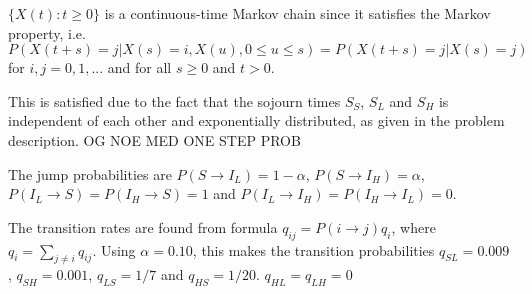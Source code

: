 $\{X(t):t \geq 0 \}$ is a continuous-time Markov chain since it satisfies the Markov property, i.e. 
$$P(X(t+s)=j|X(s)=i, X(u), 0 \leq u \leq s)=P(X(t+s)=j|X(s)=j)$$ 
for $i,j = 0,1,...$ and for all $s \geq 0$ and $t >0 $.

This is satisfied due to the fact that the sojourn times $S_S$, $S_L$ and $S_H$ is independent of each other and exponentially distributed, as given in the problem description.  OG NOE MED ONE STEP PROB

The jump probabilities are $P(S \rightarrow I_L)= 1 - \alpha$, $P(S \rightarrow I_H)= \alpha$, $P(I_L \rightarrow S)= P(I_H \rightarrow S) = 1$ and $P(I_L \rightarrow I_H)= P(I_H \rightarrow I_L) = 0$. 

The transition rates are found from formula $q_{ij} = P(i \rightarrow j ) q_i$, where $q_i = \sum_{j \neq i} q_{ij}$. Using $\alpha = 0.10$, this makes the transition probabilities $q_{SL} = 0.009$, $q_{SH} = 0.001$, $q_{LS} = 1/7$ and $q_{HS} = 1/20$. $q_{HL}=q_{LH}=0$ 







